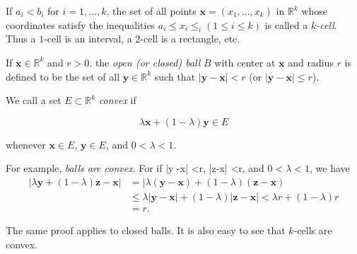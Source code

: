 If $a_i <b_i$ for $i=1,...,k$, the set of all points $\mathbf{x} =(x_1, ..., x_k)$ in $\mathbb{R}^k$ whose coordinates satisfy the inequalities $a_i \leq x_i \leq _i (1 \leq i \leq k)$ is called a \emph{$k$-cell}.\\
Thus a $1$-cell is an interval, a $2$-cell is a rectangle, etc.

If $\mathbf{x}\in \mathbb{R}^k$ and $r > 0$. the \emph{open (or closed) ball} $B$ with center at $\mathbf{x}$ and radius $r$ is defined to be the set of all $\mathbf{y} \in \mathbb{R}^k$ such that $|\mathbf{y} - \mathbf{x}| <r$ (or $|\mathbf{y} - \mathbf{x}| \leq r$).

We call a set $E \subset \mathbb{R}^k$ \emph{convex} if

\begin{equation*}
    \lambda\mathbf{x} + (1 - \lambda)\mathbf{y} \in E
\end{equation*}

whenever $\mathbf{x} \in E$, $\mathbf{y} \in E$, and $0 < \lambda < 1$.

For example, \emph{balls are convex}. For if |y -x| <r, |z-x| <r, and
$0 < \lambda <1$, we have
\begin{align*}
    |\lambda \mathbf{y} + (1-\lambda) \mathbf{z} - \mathbf{x}|
    & = |\lambda (\mathbf{y} - \mathbf{x}) + (1 - \lambda)(\mathbf{z} - \mathbf{x})\\
    & \leq \lambda |\mathbf{y} - \mathbf{x}| + (1 - \lambda)|\mathbf{z} - \mathbf{x}| < \lambda r + (1 - \lambda)r\\
    & = r.
\end{align*}

The same proof applies to closed balls. It is also easy to see that $k$-cells are convex.


